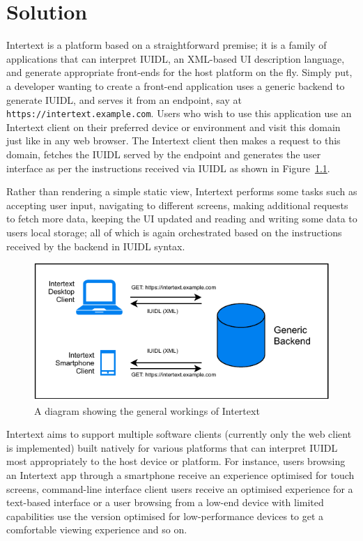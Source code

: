 
\chapter{Solution} \label{solution}


Intertext is a platform based on a straightforward premise; it is a family of applications that can interpret IUIDL, an XML-based UI description language, and generate appropriate front-ends for the host platform on the fly. Simply put, a developer wanting to create a front-end application uses a generic backend to generate IUIDL, and serves it from an endpoint, say at \texttt{https://intertext.example.com}. Users who wish to use this application use an Intertext client on their preferred device or environment and visit this domain just like in any web browser. The Intertext client then makes a request to this domain, fetches the IUIDL served by the endpoint and generates the user interface as per the instructions received via IUIDL as shown in Figure~\ref{fig:how_intertext_works}.


Rather than rendering a simple static view, Intertext performs some tasks such as accepting user input, navigating to different screens, making additional requests to fetch more data, keeping the UI updated and reading and writing some data to users local storage; all of which is again orchestrated based on the instructions received by the backend in IUIDL syntax.


\begin{figure}
  \centering
  \includegraphics[width=13cm]{thesis/paper/images/how_it_works.pdf}
  \caption{A diagram showing the general workings of Intertext}%
  \label{fig:how_intertext_works}%
\end{figure}


Intertext aims to support multiple software clients (currently only the web client is implemented) built natively for various platforms that can interpret IUIDL most appropriately to the host device or platform. For instance, users browsing an Intertext app through a smartphone receive an experience optimised for touch screens, command-line interface client users receive an optimised experience for a text-based interface or a user browsing from a low-end device with limited capabilities use the version optimised for low-performance devices to get a comfortable viewing experience and so on. 

